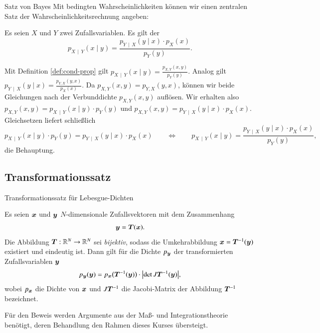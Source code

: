\begin{frame}{Satz von Bayes}{}
	Mit bedingten Wahrscheinlichkeiten können wir einen zentralen Satz der Wahrscheinlichkeitsrechnung angeben:
	\begin{mytheo}[th:bayes]
		Es seien $X$ und $Y$ zwei Zufallsvariablen. Es gilt der 
		\begin{equation*}
			p_{X\,\mid\,Y}(x \mid y) = \frac{p_{Y\,\mid\,X}(y \mid x) \cdot p_X(x)}{p_Y(y)}.
		\end{equation*}
	\end{mytheo}

	\begin{myproof}
		Mit Definition \ref{def:cond-prop} gilt $p_{X\,\mid\,Y}(x \mid y) = \frac{p_{X, Y}(x, y)}{p_Y(y)}$.
		Analog gilt $p_{Y\,\mid\,X}(y \mid x) = \frac{p_{Y, X}(y, x)}{p_X(x)}$.
		Da $p_{X, Y}(x, y) = p_{Y, X}(y, x)$, können wir beide Gleichungen nach der Verbunddichte $p_{X, Y}(x, y)$ auflösen.
		Wir erhalten also
		$p_{X, Y}(x, y) = p_{X\,\mid\,Y}(x \mid y) \cdot p_Y(y)$ und $p_{X, Y}(x, y) = p_{Y\,\mid\,X}(y \mid x) \cdot p_X(x)$.
		Gleichsetzen liefert schließlich
		\begin{equation*}
			p_{X\,\mid\,Y}(x \mid y) \cdot p_Y(y) = p_{Y\,\mid\,X}(y \mid x) \cdot p_X(x)
		\qquad\Longleftrightarrow\qquad
			p_{X\,\mid\,Y}(x \mid y) = \frac{p_{Y\,\mid\,X}(y \mid x) \cdot p_X(x)}{p_Y(y)},
		\end{equation*}
		die Behauptung.
	\end{myproof}
\end{frame}


\subsection{Transformationssatz}

\begin{frame}{Transformationssatz für Lebesgue-Dichten}{}
	\begin{mytheo}
		Es seien $\bm{x}$ und $\bm{y}$ $N$-dimensionale Zufallsvektoren mit dem Zusammenhang
		\begin{equation*}
			\bm{y} = \bm{T}(\bm{x}).
		\end{equation*}
		Die Abbildung $\bm{T} : \mathbb{R}^N \rightarrow \mathbb{R}^N$ sei \textit{bijektiv}, sodass die Umkehrabbildung $\bm{x} = \bm{T}^{-1}(\bm{y})$
		existiert und eindeutig ist. Dann gilt für die Dichte $p_{\bm{y}}$ der transformierten Zufallsvariablen $\bm{y}$
		\begin{equation*}
			p_{\bm{y}}(\bm{y}) = p_{\bm{x}}\bigl( \bm{T}^{-1}(\bm{y}) \bigr) \cdot \bigl\vert \det J\bm{T}^{-1}(\bm{y}) \bigr\vert,
		\end{equation*}
		wobei $p_{\bm{x}}$ die Dichte von $\bm{x}$ und $J \bm{T}^{-1}$ die Jacobi-Matrix der Abbildung $\bm{T}^{-1}$ bezeichnet.
	\end{mytheo}
	
	\begin{myproof}
		Für den Beweis werden Argumente aus der Maß- und Integrationstheorie benötigt, deren Behandlung den Rahmen dieses Kurses übersteigt.
	\end{myproof}
\end{frame}


